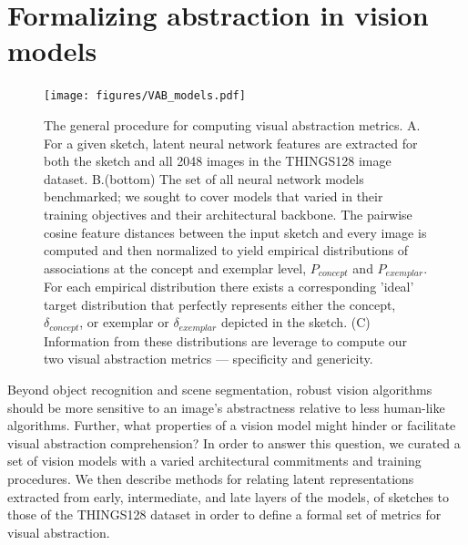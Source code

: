 \documentclass[10pt,letterpaper]{article}
\begin{document}
\section{Formalizing abstraction in vision models}
\begin{figure}
    \centering
    \texttt{[image: figures/VAB\_models.pdf]}
 
    \caption{The general procedure for computing visual abstraction metrics. A. For a given sketch, latent neural network features are extracted for both the sketch and all 2048 images in the THINGS128 image dataset. B.(bottom)  The set of all neural network models benchmarked; we sought to cover models that varied in their training objectives and their architectural backbone. The pairwise cosine feature distances between the input sketch and every image is computed and then normalized to yield empirical distributions of associations at the concept and exemplar level, $P_{concept}$ and $P_{exemplar}$. For each empirical distribution there exists a corresponding 'ideal' target distribution that perfectly represents either the concept, $\delta_{concept}$, or exemplar or $\delta_{exemplar}$ depicted in the sketch. (C) Information from these distributions are leverage to compute our two visual abstraction metrics — specificity and genericity.}

    \label{fig:trial}
\end{figure}

Beyond object recognition and scene segmentation, robust vision algorithms should be more sensitive to an image's abstractness relative to less human-like algorithms. Further, what properties of a vision model might hinder or facilitate visual abstraction comprehension? In order to answer this question, we curated a set of vision models with a varied architectural commitments and training procedures. We then describe methods for relating latent representations extracted from early, intermediate, and late layers of the models, of sketches to those of the THINGS128 dataset in order to define a formal set of metrics for visual abstraction.

\end{document}
